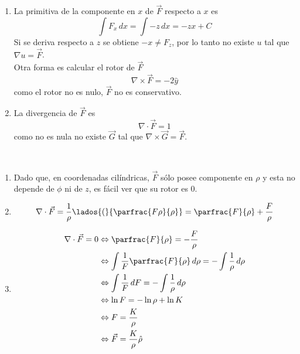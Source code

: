 \begin{enumerate}[label=\alph*)]
    \item La primitiva de la componente en $x$ de $\Vec{F}$ respecto a $x$ es
    \[\int F_x\,dx=\int -z\,dx=-zx+C\]
    Si se deriva respecto a $z$ se obtiene $-x \neq F_z$, por lo tanto no existe $u$ tal que $\nabla u = \Vec{F}$.\\
    Otra forma es calcular el rotor de $\Vec{F}$
    \[\nabla\times\Vec{F}=-2\hat{y}\]
    como el rotor no es nulo, $\Vec{F}$ no es conservativo.
    \item La divergencia de $\Vec{F}$ es
    \[\nabla\cdot\Vec{F}=1\]
    como no es nula no existe $\Vec{G}$ tal que $\nabla\times\Vec{G}=\Vec{F}$.
\end{enumerate}
\bigbreak

\\
\bigbreak

\begin{enumerate}[label=\alph*)]
    \item Dado que, en coordenadas cilíndricas, $\Vec{F}$ sólo posee componente en $\rho$ y esta no depende de $\phi$ ni de $z$, es fácil ver que su rotor es 0.
    \item \[\nabla\cdot\Vec{F}=\frac{1}{\rho}
    \lados{(}{\parfrac{F\rho}{\rho}}=\parfrac{F}{\rho}+
    \frac{F}{\rho}\]
    \item
    \begin{equation}
    \begin{split}
        \nabla\cdot\Vec{F}=0&\Leftrightarrow \parfrac{F}{\rho}=-\frac{F}{\rho}\\
        &\Leftrightarrow \int\frac{1}{F}\parfrac{F}{\rho}
        \,d\rho = -\int\frac{1}{\rho}\,d\rho\\
        &\Leftrightarrow \int\frac{1}{F}
        \,dF = -\int\frac{1}{\rho}\,d\rho\\
        &\Leftrightarrow \ln{F}=-\ln{\rho}+\ln{K}\\
        &\Leftrightarrow F=\frac{K}{\rho}\\
        &\Leftrightarrow \Vec{F}=
        \frac{K}{\rho}\hat{\rho}\\
    \end{split}
    \nonumber
    \end{equation}
\end{enumerate}

\newpage
{}\\

